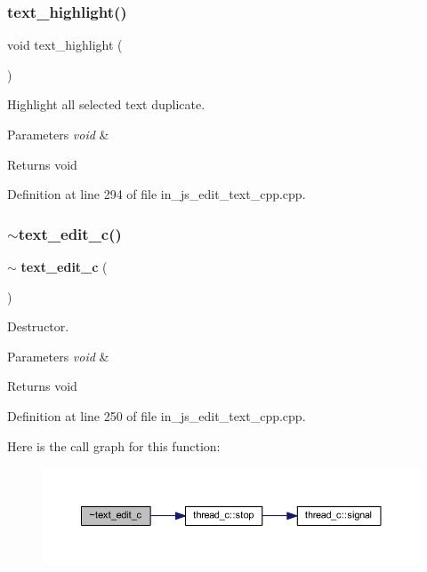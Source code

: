 \subsubsection{text\_highlight()}
{\footnotesize\ttfamily void text\+\_\+highlight (\begin{DoxyParamCaption}\item[{void}]{ }\end{DoxyParamCaption})}



Highlight all selected text duplicate. 


\begin{DoxyParams}{Parameters}
{\em void} & \\
\hline
\end{DoxyParams}
\begin{DoxyReturn}{Returns}
void 
\end{DoxyReturn}


Definition at line 294 of file in\+\_\+js\+\_\+edit\+\_\+text\+\_\+cpp.\+cpp.

\mbox{\label{group___edit__text_ga31999fc5de94e7fb992c8cdea0916481}} 
\subsubsection{$\sim$text\_edit\_c()}
{\footnotesize\ttfamily $\sim$\textbf{ text\+\_\+edit\+\_\+c} (\begin{DoxyParamCaption}\item[{void}]{ }\end{DoxyParamCaption})}



Destructor. 


\begin{DoxyParams}{Parameters}
{\em void} & \\
\hline
\end{DoxyParams}
\begin{DoxyReturn}{Returns}
void 
\end{DoxyReturn}


Definition at line 250 of file in\+\_\+js\+\_\+edit\+\_\+text\+\_\+cpp.\+cpp.

Here is the call graph for this function\+:
\nopagebreak
\begin{figure}[H]
\begin{center}
\leavevmode
\includegraphics[width=350pt]{group___edit__text_ga31999fc5de94e7fb992c8cdea0916481_cgraph}
\end{center}
\end{figure}
